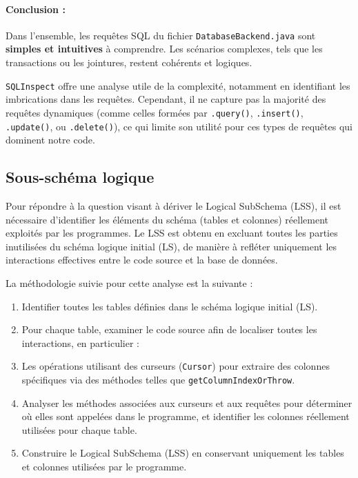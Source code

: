 \documentclass[a4paper,11pt]{article}
\begin{document}
\paragraph{Conclusion :}
Dans l'ensemble, les requêtes SQL du fichier \texttt{DatabaseBackend.java} sont \textbf{simples et intuitives} à comprendre. Les scénarios complexes, tels que les transactions ou les jointures, restent cohérents et logiques.

\texttt{SQLInspect} offre une analyse utile de la complexité, notamment en identifiant les imbrications dans les requêtes. Cependant, il ne capture pas la majorité des requêtes dynamiques (comme celles formées par \texttt{.query()}, \texttt{.insert()}, \texttt{.update()}, ou \texttt{.delete()}), ce qui limite son utilité pour ces types de requêtes qui dominent notre code.

\subsection*{Sous-schéma logique}

Pour répondre à la question visant à dériver le Logical SubSchema (LSS), il est nécessaire d’identifier les éléments du schéma (tables et colonnes) réellement exploités par les programmes. Le LSS est obtenu en excluant toutes les parties inutilisées du schéma logique initial (LS), de manière à refléter uniquement les interactions effectives entre le code source et la base de données.

La méthodologie suivie pour cette analyse est la suivante :
\begin{enumerate}
    \item Identifier toutes les tables définies dans le schéma logique initial (LS).
    \item Pour chaque table, examiner le code source afin de localiser toutes les interactions, en particulier :
    \item Les opérations utilisant des curseurs (\texttt{Cursor}) pour extraire des colonnes spécifiques via des méthodes telles que \texttt{getColumnIndexOrThrow}.
    \item Analyser les méthodes associées aux curseurs et aux requêtes pour déterminer où elles sont appelées dans le programme, et identifier les colonnes réellement utilisées pour chaque table.
    \item Construire le Logical SubSchema (LSS) en conservant uniquement les tables et colonnes utilisées par le programme.
\end{enumerate}
\end{document}

